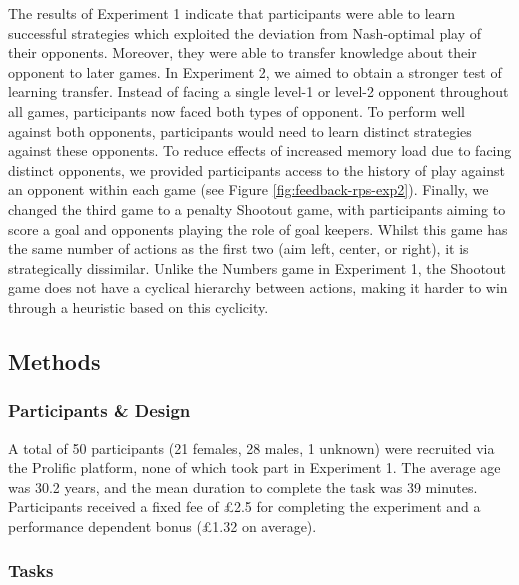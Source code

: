 \documentclass[smallextended]{svjour3}       %
\begin{document}
The results of Experiment 1 indicate that participants were able to
learn successful strategies which exploited the deviation from
Nash-optimal play of their opponents. Moreover, they were able to
transfer knowledge about their opponent to later games. In Experiment 2,
we aimed to obtain a stronger test of learning transfer. Instead of
facing a single level-1 or level-2 opponent throughout all games,
participants now faced both types of opponent. To perform well against
both opponents, participants would need to learn distinct strategies
against these opponents. To reduce effects of increased memory load due
to facing distinct opponents, we provided participants access to the
history of play against an opponent within each game (see Figure
\ref{fig:feedback-rps-exp2}). Finally, we changed the third game to a
penalty Shootout game, with participants aiming to score a goal and
opponents playing the role of goal keepers. Whilst this game has the
same number of actions as the first two (aim left, center, or right), it
is strategically dissimilar. Unlike the Numbers game in Experiment 1,
the Shootout game does not have a cyclical hierarchy between actions,
making it harder to win through a heuristic based on this cyclicity.

\hypertarget{methods-1}{%
\subsection{Methods}\label{methods-1}}

\hypertarget{participants-design}{%
\subsubsection{Participants \& Design}\label{participants-design}}

A total of 50 participants (21 females, 28 males, 1 unknown) were
recruited via the Prolific platform, none of which took part in
Experiment 1. The average age was 30.2 years, and the mean duration to
complete the task was 39 minutes. Participants received a fixed fee of
£2.5 for completing the experiment and a performance dependent bonus
(£1.32 on average).

\hypertarget{tasks-1}{%
\subsubsection{Tasks}\label{tasks-1}}
\end{document}
